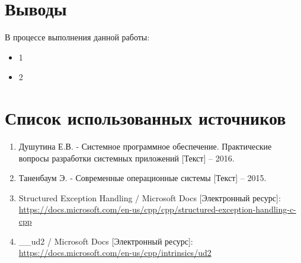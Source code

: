 \newpage

\section{Выводы}

В процессе выполнения данной работы:

\begin{itemize}
	\item 1
	\item 2
\end{itemize}

\section*{Список использованных источников}

\begin{enumerate}
	\item Душутина Е.В. - Системное программное обеспечение. Практические вопросы разработки системных приложений [Текст] -- 2016.
	\item Таненбаум Э. - Современные операционные системы [Текст] -- 2015.
	\item Structured Exception Handling / Microsoft Docs [Электронный ресурс]:\\
		{\small\url{https://docs.microsoft.com/en-us/cpp/cpp/structured-exception-handling-c-cpp}}
	\item \_\_ud2 / Microsoft Docs [Электронный ресурс]:\\
		{\small\url{https://docs.microsoft.com/en-us/cpp/intrinsics/ud2}}
\end{enumerate}


